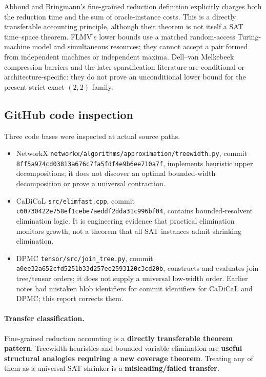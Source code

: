 \documentclass[11pt]{article}
\begin{document}
Abboud and Bringmann's fine-grained reduction definition explicitly charges both the reduction time
and the sum of oracle-instance costs.  This is a directly transferable accounting principle, although
their theorem is not itself a SAT time--space theorem.  FLMV's lower bounds use a matched random-access
Turing-machine model and simultaneous resources; they cannot accept a pair formed from independent
machines or independent maxima.  Dell--van Melkebeek compression barriers and the later sparsification
literature are conditional or architecture-specific: they do not prove an unconditional lower bound
for the present strict exact-$(2,2)$ family.

\subsection{GitHub code inspection}

Three code bases were inspected at actual source paths.
\begin{itemize}
\item NetworkX \texttt{networkx/algorithms/approximation/treewidth.py}, commit
\texttt{8ff5a974cd03813a676c7fa5fdf4e9b6ee710a7f}, implements heuristic upper decompositions;
it does not discover an optimal bounded-width decomposition or prove a universal contraction.
\item CaDiCaL \texttt{src/elimfast.cpp}, commit
\texttt{c60730422e758ef1cebe7aeddf2dda31c996bf04}, contains bounded-resolvent elimination logic.
It is engineering evidence that practical elimination monitors growth, not a theorem that all SAT
instances admit shrinking elimination.
\item DPMC \texttt{tensor/src/join\_tree.py}, commit
\texttt{a0ee32a652cfd5251b33d257ee2593120c3cd20b}, constructs and evaluates join-tree/tensor orders;
it does not supply a universal low-width order.  Earlier notes had mistaken blob identifiers for
commit identifiers for CaDiCaL and DPMC; this report corrects them.
\end{itemize}

\paragraph{Transfer classification.}
Fine-grained reduction accounting is a \textbf{directly transferable theorem pattern}.
Treewidth heuristics and bounded variable elimination are \textbf{useful structural analogies requiring
a new coverage theorem}.  Treating any of them as a universal SAT shrinker is a
\textbf{misleading/failed transfer}.
\end{document}
